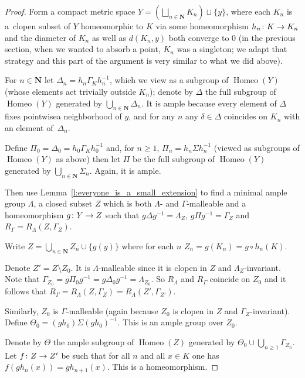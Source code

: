 \documentclass[AHL,Unicode]{cedram}
\DeclareMathOperator{\Homeo}{Homeo}
\newcommand{\N}{\mathbf{N}}
\renewcommand*{\to}{\mathchoice{\longrightarrow}{\rightarrow}{\rightarrow}{\rightarrow}}
\begin{document}
\begin{proof}
Form a compact metric space $Y= (\bigsqcup_{n \in \N} K_n) \sqcup \{y\}$, where each $K_n$ is a~clopen subset of $Y$ homeomorphic to $K$ via some homeomorphism $h_n \colon K \to K_n$ and the diameter of $K_n$ as well as $d(K_n,y)$ both converge to $0$ (in the previous section, when we wanted to absorb a point, $K_n$ was a singleton; we adapt that strategy and this part of the argument is very similar to what we did above).

For $n \in \N$ let $\Delta_n = h_n \Gamma_K h_n^{-1}$, which we view as a subgroup of $\Homeo(Y)$ (whose elements act trivially outside $K_n$); denote by $\Delta$ the full subgroup of $\Homeo(Y)$ generated by $\bigcup_{n \in \N} \Delta_n$. It is ample because every element of $\Delta$ fixes pointwise\linebreak a neighborhood of $y$, and for any $n$ any $\delta \in \Delta$ coincides on $K_n$ with an element of~$\Delta_n$.

Define $\Pi_0=\Delta_0=h_0 \Gamma_K h_0^{-1}$ and, for $n \ge 1$, $\Pi_n= h_n \Sigma h_n^{-1}$ (viewed as subgroups of $\Homeo(Y)$ as above) then let $\Pi$ be the full subgroup of $\Homeo(Y)$ generated by $\bigcup_{n \in \N} \Sigma_n$. Again, it is ample.

Then use Lemma~\ref{l:everyone_is_a_small_extension} to find a minimal ample group $\Lambda$, a closed subset $Z$ which is both $\Lambda$- and $\Gamma$-malleable and a homeomorphism $g \colon Y \to Z$ such that $g\Delta g^{-1}=\Lambda_Z$, $g \Pi g^{-1}= \Gamma_Z$ and $R_\Gamma=R_\Lambda(Z,\Gamma_Z)$.

Write $Z=\bigcup_{n \in \N} Z_n \cup \{g(y)\}$ where for each $n$ $Z_n= g(K_n)=g \circ h_n(K)$.

Denote $Z'=Z \setminus Z_0$. It is $\Lambda$-malleable since it is clopen in $Z$ and $\Lambda_Z$-invariant. Note that $\Gamma_{Z_0}=g \Pi_{0}g^{-1}=g \Delta_0 g^{-1} = \Lambda_{Z_0}$. So $R_\Lambda$ and $R_\Gamma$ coincide on $Z_0$ and it follows that $R_\Gamma=R_\Lambda(Z,\Gamma_Z)=R_\Lambda(Z',\Gamma_{Z'})$.

Similarly, $Z_0$ is $\Gamma$-malleable (again because $Z_0$ is clopen in $Z$ and $\Gamma_Z$-invariant). Define $\Theta_0 = (gh_0) \Sigma (gh_0) ^{-1}$. This is an ample group over $Z_0$.

Denote by $\Theta$ the ample subgroup of $\Homeo(Z)$ generated by $\Theta_0 \cup \bigcup_{n \ge 1} \Gamma_{Z_n}$. Let $f \colon Z \to Z'$ be such that for all $n$ and all $x \in K$ one has $f(gh_n(x))=gh_{n+1}(x)$. This is a homeomorphism.


\end{proof}
\end{document}
